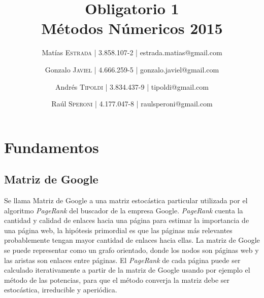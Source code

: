 \documentclass{article}
\title{Obligatorio 1 \\ Métodos Númericos 2015 } %
\author{Matías \textsc{Estrada} | 3.858.107-2 | estrada.matias@gmail.com
\and Gonzalo \textsc{Javiel} | 4.666.259-5 | gonzalo.javiel@gmail.com
\and Andrés \textsc{Tipoldi} | 3.834.437-9 | tipoldi@gmail.com
\and Raúl \textsc{Speroni} | 4.177.047-8 | raulsperoni@gmail.com } %
\begin{document}

\begin{titlepage}
\maketitle %
\end{titlepage}

\tableofcontents
\newpage


\section{Fundamentos}

\subsection{Matriz de Google}
\label{definitions}

Se llama Matriz de Google a una matriz estocástica particular utilizada por el algoritmo \textit{PageRank} del buscador de la empresa Google.
\textit{PageRank} cuenta la cantidad y calidad de enlaces hacia una página para estimar la importancia de una página web, la hipótesis primordial es que las páginas más relevantes probablemente tengan mayor cantidad de enlaces hacia ellas.
La matriz de Google se puede representar como un grafo orientado, donde los nodos son páginas web y las aristas son enlaces entre páginas. \cite{2345160020060101}  El \textit{PageRank} de cada página puede ser calculado iterativamente a partir de la matriz de Google usando por ejemplo el método de las potencias, para que el método converja la matriz debe ser estocástica, irreducible y aperiódica.
\end{document}
